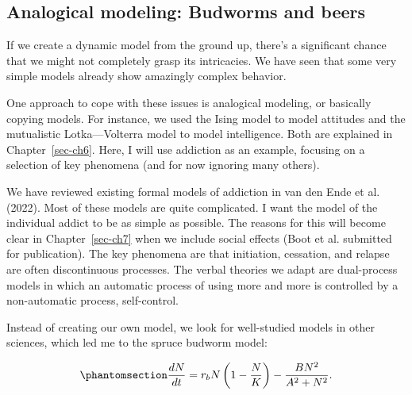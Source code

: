 \documentclass[
  a4paper,
  DIV=11,
  numbers=noendperiod,
  oneside]{scrreprt}
\begin{document}
\subsection{Analogical modeling: Budworms and
beers}\label{sec-Analogical-modeling-Budworms-and-Beers}

If we create a dynamic model from the ground up, there's a significant
chance that we might not completely grasp its intricacies. We have seen
that some very simple models already show amazingly complex behavior.

One approach to cope with these issues is analogical modeling, or
basically copying models. For instance, we used the Ising model to model
attitudes and the mutualistic Lotka---Volterra model to model
intelligence. Both are explained in Chapter~\ref{sec-ch6}. Here, I will
use addiction as an example, focusing on a selection of key phenomena
(and for now ignoring many others).

We have reviewed existing formal models of addiction in van den Ende et
al. (2022). Most of these models are quite complicated. I want the model
of the individual addict to be as simple as possible. The reasons for
this will become clear in Chapter~\ref{sec-ch7} when we include social
effects (Boot et al. submitted for publication). The key phenomena are
that initiation, cessation, and relapse are often discontinuous
processes. The verbal theories we adapt are dual-process models in which
an automatic process of using more and more is controlled by a
non-automatic process, self-control.

Instead of creating our own model, we look for well-studied models in
other sciences, which led me to the spruce budworm model:

\begin{equation}\phantomsection\label{eq-ch4n-17-old-37}{
\frac{dN}{dt} = r_{b}N\left( 1 - \frac{N}{K} \right) - \frac{BN^{2}}{A^{2} + N^{2}}.
}\end{equation}
\end{document}
